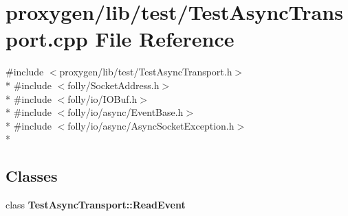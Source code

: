\section{proxygen/lib/test/\+Test\+Async\+Transport.cpp File Reference}
\label{TestAsyncTransport_8cpp}
{\ttfamily \#include $<$proxygen/lib/test/\+Test\+Async\+Transport.\+h$>$}\\*
{\ttfamily \#include $<$folly/\+Socket\+Address.\+h$>$}\\*
{\ttfamily \#include $<$folly/io/\+I\+O\+Buf.\+h$>$}\\*
{\ttfamily \#include $<$folly/io/async/\+Event\+Base.\+h$>$}\\*
{\ttfamily \#include $<$folly/io/async/\+Async\+Socket\+Exception.\+h$>$}\\*
\subsection*{Classes}
\begin{DoxyCompactItemize}
\item 
class {\bf Test\+Async\+Transport\+::\+Read\+Event}
\end{DoxyCompactItemize}
